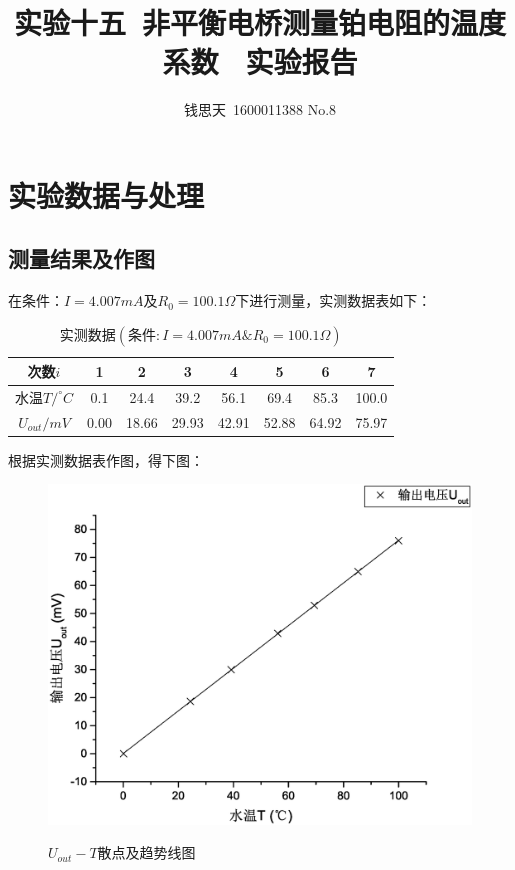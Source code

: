 \documentclass{ctexart}
\author{钱思天\ 1600011388 No.8}
\title{实验十五\ 非平衡电桥测量铂电阻的温度系数 \ 实验报告}
\begin{document}
      \maketitle
      \section{实验数据与处理}
      \subsection{测量结果及作图}
      在条件：$I=4.007mA$及$R_0=100.1\Omega$下进行测量，实测数据表如下：
\begin{table}[H]
  \centering
  \caption{实测数据$(\mbox{条件}:I=4.007mA\&R_0=100.1\Omega)$}
    \begin{tabular}{|c|c|c|c|c|c|c|c|}
      \hline
    次数$i$     & 1     & 2     & 3     & 4     & 5     & 6     & 7 \\
    \hline
    水温$T/^\circ C$     & 0.1   & 24.4  & 39.2  & 56.1  & 69.4  & 85.3  & 100.0 \\
    \hline
    $U_{out}/mV$ & 0.00  & 18.66 & 29.93 & 42.91 & 52.88 & 64.92 & 75.97 \\
  \hline  
  \end{tabular}%
  \label{tab:addlabel}%
\end{table}%

根据实测数据表作图，得下图：

\begin{figure}[H]
  \centering
  \caption{$U_{out}-T$散点及趋势线图}
  \includegraphics[width=1.0\textwidth]{1}
  \label{fig:digit}
\end{figure}
\end{document}
